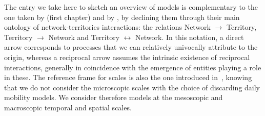 \documentclass[10pt]{article}
\begin{document}
The entry we take here to sketch an overview of models is complementary to the one taken by \cite{raimbault2018caracterisation} (first chapter) and by \cite{raimbault2020systematic}, by declining them through their main ontology of network-territories interactions: the relations Network $\rightarrow$ Territory, Territory $\rightarrow$ Network and Territory $\leftrightarrow$ Network. In this notation, a direct arrow corresponds to processes that we can relatively univocally attribute to the origin, whereas a reciprocal arrow assumes the intrinsic existence of reciprocal interactions, generally in coincidence with the emergence of entities playing a role in these. The reference frame for scales is also the one introduced in~\cite{raimbault2018caracterisation}, knowing that we do not consider the microscopic scales with the choice of discarding daily mobility models. We consider therefore models at the mesoscopic and macroscopic temporal and spatial scales.



\end{document}
